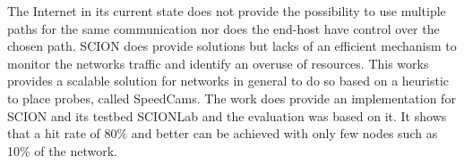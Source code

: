 \documentclass[thesis.tex]{subfiles}
\begin{document}
The Internet in its current state does not provide the possibility to use multiple paths for the same communication nor does the end-host have control over the chosen path. SCION \cite{SCIONBook, SCIONPaper} does provide solutions but lacks of an efficient mechanism to monitor the networks traffic and identify an overuse of resources. This works provides a scalable solution for networks in general to do so based on a heuristic to place probes, called SpeedCams. The work does provide an implementation for SCION and its testbed SCIONLab and the evaluation was based on it. It shows that a hit rate of 80\% and better can be achieved with only few nodes such as 10\% of the network.
\end{document}

